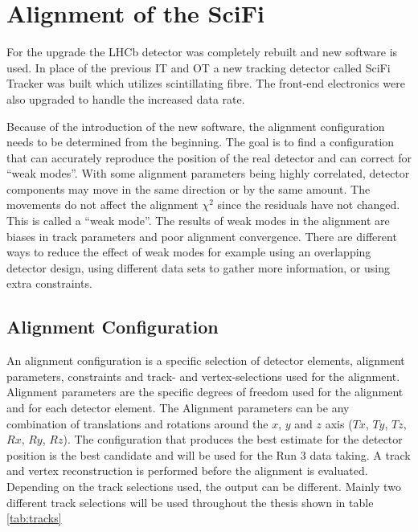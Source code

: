 \chapter{Alignment of the SciFi}
\label{sec:story}

For the upgrade the LHCb detector was completely rebuilt and new software is used. In place of the previous IT and OT a new tracking detector called SciFi Tracker was built which utilizes scintillating fibre. The front-end electronics were also upgraded to handle the increased data rate.

Because of the introduction of the new software, the alignment configuration needs to be determined from the beginning. The goal is to find a configuration that can accurately reproduce the position of the real detector and can correct for ``weak modes''.
With some alignment parameters being highly correlated, detector components may move in the same direction or by the same amount. The movements do not affect the alignment $\chi^2$ since the residuals have not changed. This is called a ``weak mode''. The results of weak modes in the alignment are biases in track parameters and poor alignment convergence.
There are different ways to reduce the effect of weak modes for example using an overlapping detector design, using different data sets to gather more information, or using extra constraints.

\section{Alignment Configuration}

An alignment configuration is a specific selection of detector elements, alignment parameters, constraints and track- and vertex-selections used for the alignment.
Alignment parameters are the specific degrees of freedom used for the alignment and for each detector element. The Alignment parameters can be any combination of translations and rotations around the $x$, $y$ and $z$ axis ($Tx$, $Ty$, $Tz$, $Rx$, $Ry$, $Rz$).
The configuration that produces the best estimate for the detector position is the best candidate and will be used for the Run 3 data taking.
A track and vertex reconstruction is performed before the alignment is evaluated. Depending on the track selections used, the output can be different. Mainly two different track selections will be used throughout the thesis shown in table \ref{tab:tracks}

